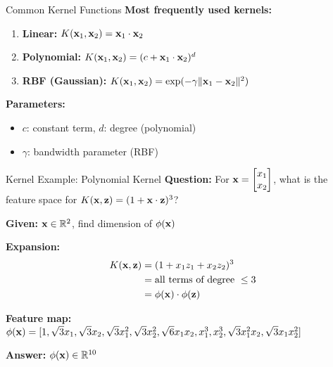 \documentclass{beamer}
\begin{document}
	\begin{frame}{Common Kernel Functions}
	\textbf{Most frequently used kernels:}
	    \begin{enumerate}
	        \item \textbf{Linear:} $K(\mathbf{x}_{1}, \mathbf{x}_{2}) = \mathbf{x}_{1} \cdot \mathbf{x}_{2}$
	        \item \textbf{Polynomial:} $K(\mathbf{x}_{1}, \mathbf{x}_{2}) = (c + \mathbf{x}_{1} \cdot \mathbf{x}_{2})^{d}$
	        \item \textbf{RBF (Gaussian):} $K(\mathbf{x}_{1}, \mathbf{x}_{2}) = \exp(-\gamma\|\mathbf{x}_{1} - \mathbf{x}_{2}\|^{2})$
	    \end{enumerate}
	    
	    \vspace{0.5cm}
	    \textbf{Parameters:}
	    \begin{itemize}
	    	\item $c$: constant term, $d$: degree (polynomial)
	    	\item $\gamma$: bandwidth parameter (RBF)
	    \end{itemize}
	\end{frame}
	\begin{frame}{Kernel Example: Polynomial Kernel}
	    \textbf{Question:} For $\mathbf{x} = \begin{bmatrix}x_{1} \\ x_{2} \end{bmatrix}$, what is the feature space for $K(\mathbf{x}, \mathbf{z}) = (1 + \mathbf{x} \cdot \mathbf{z})^{3}$?
	    
	    \textbf{Given:} $\mathbf{x} \in \mathbb{R}^{2}$, find dimension of $\phi(\mathbf{x})$
	    
	    \textbf{Expansion:}
	    \begin{align*}
	        K(\mathbf{x}, \mathbf{z}) &= (1 + x_{1}z_{1} + x_{2}z_{2})^{3} \\
	        &= \text{all terms of degree } \leq 3 \\
	        &= \phi(\mathbf{x}) \cdot \phi(\mathbf{z})
	    \end{align*}
	    
	    \textbf{Feature map:} $\phi(\mathbf{x}) = [1, \sqrt{3}x_1, \sqrt{3}x_2, \sqrt{3}x_1^2, \sqrt{3}x_2^2, \sqrt{6}x_1x_2, x_1^3, x_2^3, \sqrt{3}x_1^2x_2, \sqrt{3}x_1x_2^2]$
	    
	    \textbf{Answer:} $\phi(\mathbf{x}) \in \mathbb{R}^{10}$
	\end{frame}
\end{document}
